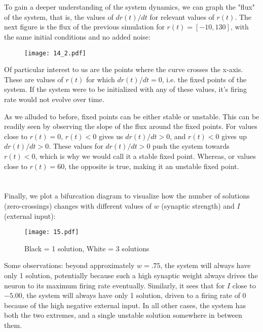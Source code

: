 \documentclass{article}
\begin{document}
\section{}
To gain a deeper understanding of the system dynamics, we can graph the "flux" of the system, that is, the values of $dr(t)/dt$ for relevant values of $r(t)$. The next figure is the flux of the previous simulation for $r(t) = [-10, 130]$, with the same initial conditions and no added noise:

\begin{figure}[ht]
    \centering
    \texttt{[image: 14\_2.pdf]}
\end{figure}

Of particular interest to us are the points where the curve crosses the x-axis. These are values of $r(t)$ for which $dr(t)/dt = 0$, i.e. the fixed points of the system. If the system were to be initialized with any of these values, it's firing rate would not evolve over time. 
\vspace{.5em}

As we alluded to before, fixed points can be either stable or unstable. This can be readily seen by observing the slope of the flux around the fixed points. For values close to $r(t) = 0$, $r(t) < 0$ gives us $dr(t)/dt > 0$, and $r(t) < 0$ gives up $dr(t)/dt > 0$. These values for $dr(t)/dt > 0$ push the system towards $r(t) < 0$, which is why we would call it a stable fixed point. Whereas, or values close to $r(t) = 60$, the opposite is true, making it an unstable fixed point.
\vspace{1em}



\newpage
\section{}
Finally, we plot a bifurcation diagram to visualize how the number of solutions (zero-crossings) changes with different values of $w$ (synaptic strength) and $I$ (external input):

\begin{figure}[ht]
    \centering
    \texttt{[image: 15.pdf]}
    \caption{Black = 1 solution, White = 3 solutions }
\end{figure}

Some observations: beyond approximately $w = .75$, the system will always have only 1 solution, potentially because such a high synaptic weight always drives the neuron to its maximum firing rate eventually. Similarly, it sees that for $I$ close to $-5.00$, the system will always have only 1 solution, driven to a firing rate of $0$ because of the high negative external input. In all other cases, the system has both the two extremes, and a single unstable solution somewhere in between them.
\vspace{1em}
\end{document}
